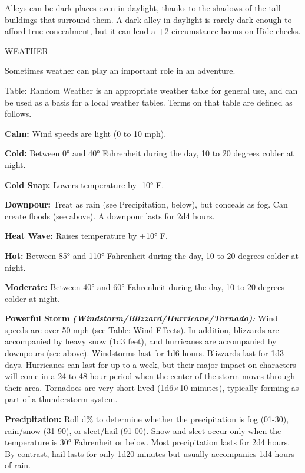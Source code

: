 \documentclass{article}
\begin{document}
Alleys can be dark places even in daylight, thanks to the shadows of the tall buildings 
that surround them. A dark alley in daylight is rarely dark enough to afford true 
concealment, but it can lend a +2 circumstance bonus on Hide checks.

\vspace{12pt}
WEATHER

Sometimes weather can play an important role in an adventure.

Table: Random Weather is an appropriate weather table for general use, and can 
be used as a basis for a local weather tables. Terms on that table are defined 
as follows.

\textbf{Calm:} Wind speeds are light (0 to 10 mph).

\textbf{Cold:} Between 0° and 40° Fahrenheit during the day, 10 to 20 degrees 
colder at night.

\textbf{Cold Snap: }Lowers temperature by -10° F.

\textbf{Downpour:} Treat as rain (see Precipitation, below), but conceals as fog. 
Can create floods (see above). A downpour lasts for 2d4 hours.

\textbf{Heat Wave:} Raises temperature by +10° F.

\textbf{Hot:} Between 85° and 110° Fahrenheit during the day, 10 to 20 degrees 
colder at night.

\textbf{Moderate:} Between 40° and 60° Fahrenheit during the day, 10 to 20 degrees 
colder at night.

\textbf{Powerful Storm }\textit{\textbf{(Windstorm/Blizzard/Hurricane/Tornado): 
}}Wind speeds are over 50 mph (see Table: Wind Effects). In addition, blizzards 
are accompanied by heavy snow (1d3 feet), and hurricanes are accompanied by downpours 
(see above). Windstorms last for 1d6 hours. Blizzards last for 1d3 days. Hurricanes 
can last for up to a week, but their major impact on characters will come in a 
24-to-48-hour period when the center of the storm moves through their area. Tornadoes 
are very short-lived (1d6\ensuremath{\times}10 minutes), typically forming as part 
of a thunderstorm system. 

\textbf{Precipitation:} Roll d\% to determine whether the precipitation is fog 
(01-30), rain/snow (31-90), or sleet/hail (91-00). Snow and sleet occur only when 
the temperature is 30° Fahrenheit or below. Most precipitation lasts for 2d4 hours. 
By contrast, hail lasts for only 1d20 minutes but usually accompanies 1d4 hours 
of rain.
\end{document}
